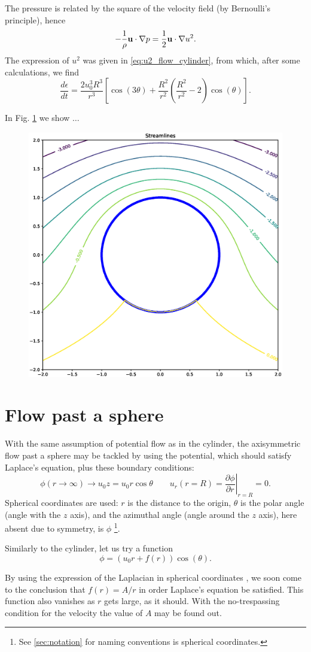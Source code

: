 The pressure is related by the square of the velocity field (by Bernoulli's principle), hence
\[
-\frac{1}{\rho} \mathbf{u} \cdot \nabla p =  \frac12 \mathbf{u} \cdot \nabla u^2 .
\]
The expression of $u^2$ was given in \eqref{eq:u2_flow_cylinder}, from
which, after some calculations, we find
\[
\frac{d \epsilon}{d t} =
\frac{2 u_0^3 R^3}{r^3}
\left[ 
\cos(3\theta) +
\frac{R^2}{r^2}
\left( \frac{R^2}{r^2} - 2 \right) \cos(\theta)
\right] .
\]

In Fig. \ref{fig:potential_flow_past_cylinder_energy} we show $\ldots$


\begin{figure}
	\centering
	\includegraphics[width=0.4\linewidth]{figures/potential_flow_past_cylinder_rotating}
	\caption{\label{fig:potential_flow_past_cylinder_energy}}
\end{figure}



\section{Flow past a sphere}

With the same assumption of potential flow as in the cylinder, the
axisymmetric flow past a sphere may be tackled by using the potential,
which should satisfy Laplace's equation, plus these boundary
conditions:
\[
  \phi (r\to \infty) \to u_0 z = u_0 r \cos\theta \qquad
  u_r(r=R) =\left. \frac{\partial \phi}{\partial r} \right|_{r=R} = 0 .
\]
Spherical coordinates  are used:
$r$ is the distance to the origin, $\theta$ is the polar angle (angle
with the $z$ axis), and the azimuthal angle (angle around the $z$
axis), here absent due to symmetry, is $\phi$ %
\footnote{See \ref{sec:notation} for naming conventions is spherical
coordinates.}.


Similarly to the cylinder, let us try a function
\[
\phi =  \left( u_0 r  + f(r) \right) \cos(\theta)  .
\]

By using the expression of the Laplacian in spherical coordinates
\cite{wiki:del}, we soon come to the conclusion that $f(r)= A/r $ in
order Laplace's equation be satisfied. This function also vanishes as
$r$ gets large, as it should. With the no-trespassing condition for the
velocity the value of $A$ may be found out.


